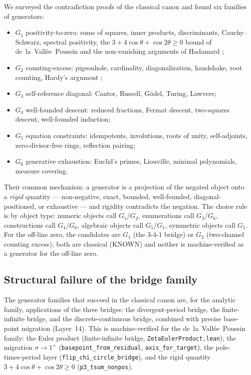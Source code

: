 \documentclass{article}
\begin{document}
We surveyed the contradiction proofs of the classical canon and found
six families of generators:
\begin{itemize}
\item $G_1$ positivity-to-zero: sums of squares, inner products,
  discriminants, Cauchy--Schwarz, spectral positivity, the
  $3+4\cos\theta+\cos 2\theta\ge 0$ bound of de~la~Vall\'ee~Poussin
  \cite{delavallee1899} and the non-vanishing arguments of Hadamard
  \cite{hadamard1896};
\item $G_2$ counting-excess: pigeonhole, cardinality, diagonalization,
  handshake, root counting, Hardy's argument \cite{hardy1914};
\item $G_3$ self-reference diagonal: Cantor, Russell, G\"odel, Turing,
  Lawvere;
\item $G_4$ well-founded descent: reduced fractions, Fermat descent,
  two-squares descent, well-founded induction;
\item $G_5$ equation constraints: idempotents, involutions, roots of
  unity, self-adjoints, zero-divisor-free rings, reflection pairing;
\item $G_6$ generative exhaustion: Euclid's primes, Liouville,
  minimal polynomials, measure covering.
\end{itemize}
Their common mechanism: a generator is a projection of the negated
object onto a \emph{rigid} quantity --- non-negative, exact, bounded,
well-founded, diagonal-positioned, or exhaustive --- and rigidity
contradicts the negation. The choice rule is by object type: numeric
objects call $G_1$/$G_2$, enumerations call $G_3$/$G_6$, constructions
call $G_4$/$G_6$, algebraic objects call $G_5$/$G_1$, symmetric objects
call $G_5$. For the off-line zero, the candidates are $G_1$ (the
$3$-$4$-$1$ bridge) or $G_2$ (two-channel counting excess); both are
classical (KNOWN) and neither is machine-verified as a generator for the
off-line zero.

\subsection{Structural failure of the bridge family}
\label{sec:partIII:fail}

The generator families that succeed in the classical canon are, for the
analytic family, applications of the three bridges: the divergent-period
bridge, the finite-infinite bridge, and the discrete-continuous bridge,
combined with precise base-point migration (Layer~14). This is
machine-verified for the de~la~Vall\'ee~Poussin family: the Euler
product (finite-infinite bridge, \texttt{ZetaEulerProduct.lean}), the
migration $\sigma\to 1^+$ (\texttt{basepoint\_from\_residual},
\texttt{axis\_for\_target}), the pole-times-period layer
(\texttt{flip\_chi\_circle\_bridge}), and the rigid quantity
$3+4\cos\theta+\cos2\theta\ge0$ (\texttt{p3\_tsum\_nonpos}).
\end{document}
